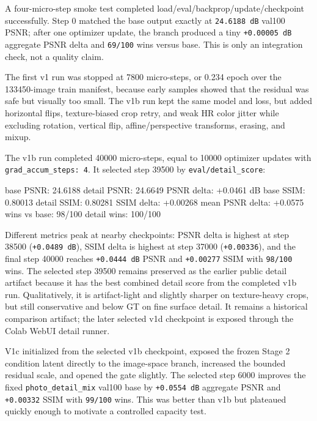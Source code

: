 \documentclass[
  10pt,
]{article}
\newenvironment{Shaded}{}{}
\newcommand{\NormalTok}[1]{#1}
\begin{document}
A four-micro-step smoke test completed
load/eval/backprop/update/checkpoint successfully. Step 0 matched the
base output exactly at \texttt{24.6188\ dB} val100 PSNR; after one
optimizer update, the branch produced a tiny \texttt{+0.00005\ dB}
aggregate PSNR delta and \texttt{69/100} wins versus base. This is only
an integration check, not a quality claim.

The first v1 run was stopped at 7800 micro-steps, or 0.234 epoch over
the 133450-image train manifest, because early samples showed that the
residual was safe but visually too small. The v1b run kept the same
model and loss, but added horizontal flips, texture-biased crop retry,
and weak HR color jitter while excluding rotation, vertical flip,
affine/perspective transforms, erasing, and mixup.

The v1b run completed 40000 micro-steps, equal to 10000 optimizer
updates with \texttt{grad\_accum\_steps:\ 4}. It selected step 39500 by
\texttt{eval/detail\_score}:

\begin{Shaded}
\begin{Highlighting}[]
\NormalTok{base PSNR:        24.6188}
\NormalTok{detail PSNR:      24.6649}
\NormalTok{PSNR delta:       +0.0461 dB}
\NormalTok{base SSIM:        0.80013}
\NormalTok{detail SSIM:      0.80281}
\NormalTok{SSIM delta:       +0.00268}
\NormalTok{mean PSNR delta:  +0.0575}
\NormalTok{wins vs base:     98/100}
\NormalTok{detail wins:      100/100}
\end{Highlighting}
\end{Shaded}

Different metrics peak at nearby checkpoints: PSNR delta is highest at
step 38500 (\texttt{+0.0489\ dB}), SSIM delta is highest at step 37000
(\texttt{+0.00336}), and the final step 40000 reaches
\texttt{+0.0444\ dB} PSNR and \texttt{+0.00277} SSIM with
\texttt{98/100} wins. The selected step 39500 remains preserved as the
earlier public detail artifact because it has the best combined detail
score from the completed v1b run. Qualitatively, it is artifact-light
and slightly sharper on texture-heavy crops, but still conservative and
below GT on fine surface detail. It remains a historical comparison
artifact; the later selected v1d checkpoint is exposed through the Colab
WebUI detail runner.

V1c initialized from the selected v1b checkpoint, exposed the frozen
Stage 2 condition latent directly to the image-space branch, increased
the bounded residual scale, and opened the gate slightly. The selected
step 6000 improves the fixed \texttt{photo\_detail\_mix} val100 base by
\texttt{+0.0554\ dB} aggregate PSNR and \texttt{+0.00332} SSIM with
\texttt{99/100} wins. This was better than v1b but plateaued quickly
enough to motivate a controlled capacity test.
\end{document}
